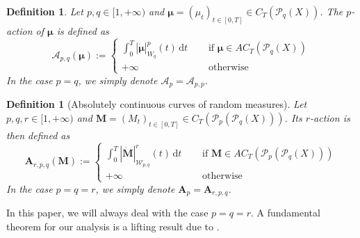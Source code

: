 \documentclass[10pt,leqno]{amsart}
\numberwithin{equation}{section}
\newtheorem{df}[teorema]{Definition}
\newcommand{\PP}{\mathcal{P}}
\renewcommand{\d}{\mathrm{d}}
\begin{document}
\begin{df}\label{energy curve of meas}
    Let $p,q\in [1,+\infty)$ and $\boldsymbol{\mu}=(\mu_t)_{t\in[0,T]}\in C_T(\PP_q(X))$. The $p$-action of $\boldsymbol{\mu}$ is defined as 
    \begin{equation}
        \mathcal{A}_{p,q}(\boldsymbol{\mu}):= \begin{cases}
            \int_0^T |\dot{\boldsymbol{\mu}}|^p_{W_q}(t) \,\d t \quad & \text{ if }\boldsymbol{\mu} \in AC_T(\PP_q(X))
            \\
            +\infty \ & \text{ otherwise}
        \end{cases}
    \end{equation}
    In the case $p=q$, we simply denote $\mathcal{A}_p=\mathcal{A}_{p,p}$.
\end{df}

\begin{df}[Absolutely continuous curves of random measures]
    Let $p,q,r \in [1,+\infty)$ and $\boldsymbol{M} = (M_t)_{t\in [0,T]} \in C_T(\PP_p(\PP_q(X)))$. Its $r$-action is then defined as 
    \begin{equation}
        \boldsymbol{A}_{r,p,q}(\boldsymbol{M}) :=
        \begin{cases}
            \int_0^T |\dot{\boldsymbol{M}}|^r_{\mathcal{W}_{p,q}}(t) \,\d t \quad & \text{ if }\boldsymbol{M} \in AC_T(\PP_p(\PP_q(X)))
            \\
            +\infty \ & \text{ otherwise}
        \end{cases}
    \end{equation}
    In the case $p=q=r$, we simply denote $\boldsymbol{A}_p = \boldsymbol{A}_{r,p,q}$.
\end{df}
In this paper, we will always deal with the case $p=q=r$.
A fundamental theorem for our analysis is a lifting result due to \cite{lisini2007characterization}. 
\end{document}
